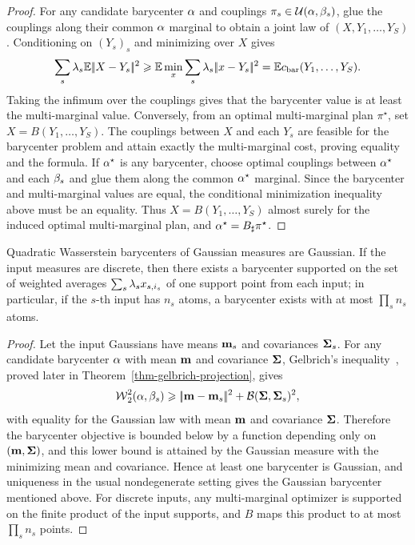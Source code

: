 \begin{proof}
	For any candidate barycenter $\alpha$ and couplings $\pi_s\in\mathcal{U}(\alpha,\beta_s)$, glue the couplings along their common $\alpha$ marginal to obtain a joint law of $(X,Y_1,\ldots,Y_S)$. Conditioning on $(Y_s)_s$ and minimizing over $X$ gives
	\[
		\sum_s\lambda_s\mathbb{E}|\!| X-Y_s |\!|^2
		\geqslant
		\mathbb{E}\min_x\sum_s\lambda_s|\!| x-Y_s |\!|^2
		=
		\mathbb{E} c_{\mathrm{bar}}(Y_1,\ldots,Y_S).
	\]
	Taking the infimum over the couplings gives that the barycenter value is at least the multi-marginal value. Conversely, from an optimal multi-marginal plan $\pi^\star$, set $X=B(Y_1,\ldots,Y_S)$. The couplings between $X$ and each $Y_s$ are feasible for the barycenter problem and attain exactly the multi-marginal cost, proving equality and the formula.
	If $\alpha^\star$ is any barycenter, choose optimal couplings between $\alpha^\star$ and each $\beta_s$ and glue them along the common $\alpha^\star$ marginal. Since the barycenter and multi-marginal values are equal, the conditional minimization inequality above must be an equality. Thus $X=B(Y_1,\ldots,Y_S)$ almost surely for the induced optimal multi-marginal plan, and $\alpha^\star=B_\sharp\pi^\star$.
\end{proof}

\begin{cor}\label{cor-gaussian-discrete-barycenters}
	Quadratic Wasserstein barycenters of Gaussian measures are Gaussian. If the input measures are discrete, then there exists a barycenter supported on the set of weighted averages $\sum_s\lambda_s x_{s,i_s}$ of one support point from each input; in particular, if the $s$-th input has $n_s$ atoms, a barycenter exists with at most $\prod_s n_s$ atoms.
\end{cor}

\begin{proof}
	Let the input Gaussians have means $\mathbf{m}_s$ and covariances $\mathbf{\Sigma}_s$. For any candidate barycenter $\alpha$ with mean $\mathbf{m}$ and covariance $\mathbf{\Sigma}$, Gelbrich's inequality~\cite{gelbrich1990formula}, proved later in Theorem~\ref{thm-gelbrich-projection}, gives
	\[
		\operatorname{\mathcal{W}}_2^2(\alpha,\beta_s)
		\geqslant
		|\!| \mathbf{m}-\mathbf{m}_s |\!|^2+\mathcal{B}(\mathbf{\Sigma},\mathbf{\Sigma}_s)^2,
	\]
	with equality for the Gaussian law with mean $\mathbf{m}$ and covariance $\mathbf{\Sigma}$. Therefore the barycenter objective is bounded below by a function depending only on $(\mathbf{m},\mathbf{\Sigma})$, and this lower bound is attained by the Gaussian measure with the minimizing mean and covariance. Hence at least one barycenter is Gaussian, and uniqueness in the usual nondegenerate setting gives the Gaussian barycenter mentioned above. For discrete inputs, any multi-marginal optimizer is supported on the finite product of the input supports, and $B$ maps this product to at most $\prod_s n_s$ points.
\end{proof}

